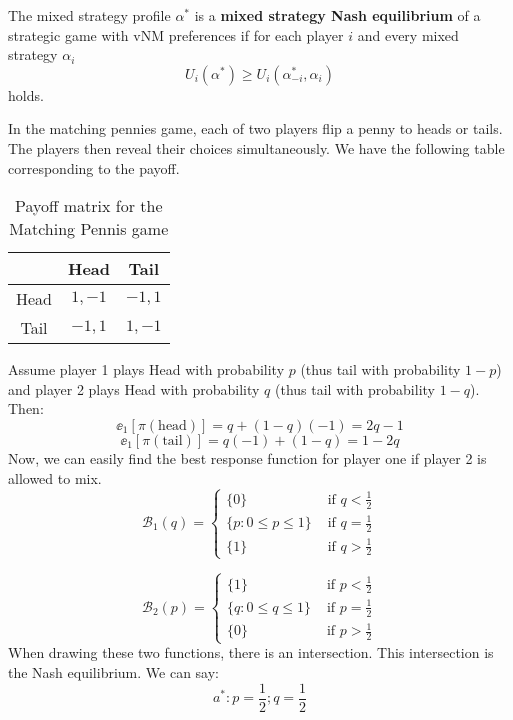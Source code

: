 \begin{definition}
      The mixed strategy profile $\alpha^{*}$ is a \textbf{mixed strategy Nash equilibrium} of a strategic game with vNM preferences if for each player $i$ and every mixed strategy $\alpha_{i}$
      $$
            U_{i}(\alpha^*) \geq U_{i}\left(\alpha^*_{-i}, \alpha_{i}\right)
      $$
      holds.
\end{definition}


\begin{example}
      In the matching pennies game, each of two players flip a penny to heads or tails. The players then reveal their choices simultaneously. We have the following table corresponding to the payoff.
      \begin{table}[h!]
            \begin{center}
                  \begin{tabular}{ c | c c }
                             & Head    & Tail    \\ \hline
                        Head & $1,-1$  & $-1,1$  \\
                        Tail & $-1, 1$ & $1, -1$
                  \end{tabular}
                  \vspace{-5pt}
                  \caption{Payoff matrix for the Matching Pennis game}
                  \vspace{-20pt}
            \end{center}
      \end{table}
      Assume player 1 plays Head with probability $p$ (thus tail with probability $1-p$) and player 2 plays Head with probability $q$ (thus tail with probability $1-q$). Then:
      \[
            \ee_1[\pi(\text{head})]=q+(1-q)(-1)=2 q-1
      \]
      \[
            \ee_1[\pi(\text{tail})]=q(-1)+(1-q)=1-2 q
      \]
      Now, we can easily find the best response function for player one if player 2 is allowed to mix.
      \[
            \mathcal{B}_{1}(q)=\left\{\begin{array}{cl}
                  \{0\}                  & \text { if } q<\frac{1}{2} \\
                  \{p: 0 \leq p \leq 1\} & \text { if } q=\frac{1}{2} \\
                  \{1\}                  & \text { if } q>\frac{1}{2}
            \end{array}\right.
      \]

      \[
            \mathcal{B}_{2}(p)=\left\{\begin{aligned}
                  \{1\}                  & \text { if } p<\frac{1}{2} \\
                  \{q: 0 \leq q \leq 1\} & \text { if } p=\frac{1}{2} \\
                  \{0\}                  & \text { if } p>\frac{1}{2}
            \end{aligned}\right.\]
      When drawing these two functions, there is an intersection. This intersection is the Nash equilibrium. We can say:
      \[
            a^{*}: p =\frac{1}{2}; q = \frac{1}{2}
      \]
\end{example}


